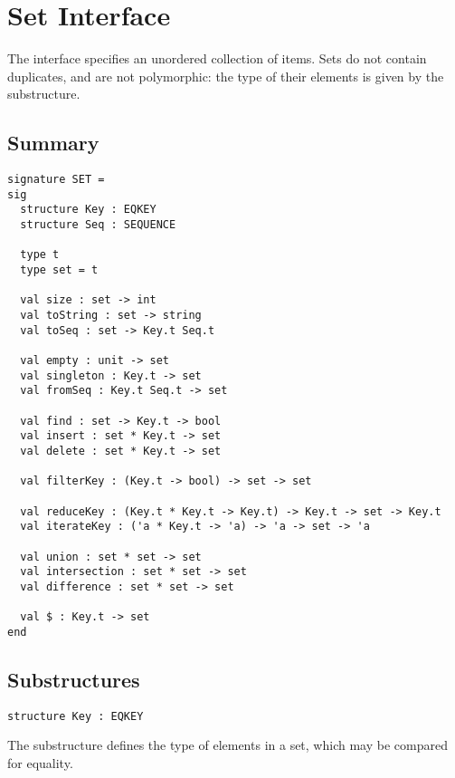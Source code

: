 \chapter{Set Interface}
\label{ch:set-interface}

\begin{preamble}
The  interface specifies an unordered collection of items. Sets do not
contain duplicates, and are not polymorphic: the type of their elements is
given by the  substructure.
\end{preamble}

\section{Summary}
\begin{gram}
\begin{verbatim}
signature SET =
sig
  structure Key : EQKEY
  structure Seq : SEQUENCE

  type t
  type set = t

  val size : set -> int
  val toString : set -> string
  val toSeq : set -> Key.t Seq.t

  val empty : unit -> set
  val singleton : Key.t -> set
  val fromSeq : Key.t Seq.t -> set

  val find : set -> Key.t -> bool
  val insert : set * Key.t -> set
  val delete : set * Key.t -> set

  val filterKey : (Key.t -> bool) -> set -> set

  val reduceKey : (Key.t * Key.t -> Key.t) -> Key.t -> set -> Key.t
  val iterateKey : ('a * Key.t -> 'a) -> 'a -> set -> 'a

  val union : set * set -> set
  val intersection : set * set -> set
  val difference : set * set -> set

  val $ : Key.t -> set
end
\end{verbatim}
\end{gram}


\section{Substructures}

\begin{gram}
\begin{verbatim}
structure Key : EQKEY
\end{verbatim}
The  substructure defines the type of elements in a set, which may be
compared for equality.
\end{gram}

